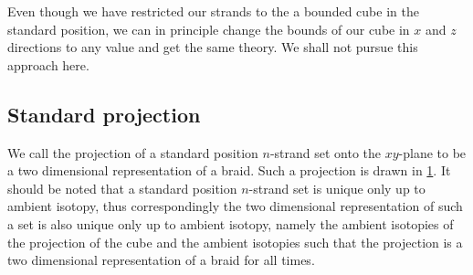 \begin{remark}
	Even though we have restricted our strands to the a bounded cube in the standard position, we can in principle change the bounds of our cube in \(x\) and \(z\) directions to any value and get the same theory. We shall not pursue this approach here.
\end{remark}

\subsection{Standard projection}

We call the projection of a standard position \(n\)-strand set onto the \(xy\)-plane to be a two dimensional representation of a braid. Such a projection is drawn in \cref{fig:2drepbraids}. It should be noted that a standard position \(n\)-strand set is unique only up to ambient isotopy, thus correspondingly the two dimensional representation of such a set is also unique only up to ambient isotopy, namely the ambient isotopies of the projection of the cube and the ambient isotopies such that the projection is a two dimensional representation of a braid for all times.

\begin{figure}[H]
	\centering
	\label{fig:2drepbraids}
\end{figure}

